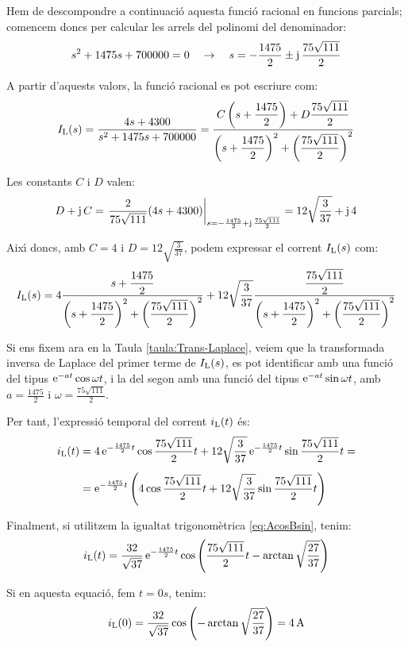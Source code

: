 \begin{exemple}
Hem de descompondre a continuaci\'{o} aquesta funci\'{o} racional en
funcions parcials; comencem doncs per calcular les arrels del
polinomi del denominador:
\[
s^2 +1475 s + 700000 = 0 \quad\rightarrow\quad s= -\frac{1475}{2}
\pm \mathrm{j}\,\frac{75\sqrt{111}}{2}
\]

A partir d'aquests valors, la  funci\'{o} racional es pot escriure com:
\[
    I_\mathrm{L}(s) =
    \frac{4 s+ 4300}{s^2 +1475 s + 700000} =
    \frac{C\left(s+\dfrac{1475}{2}\right)+D\dfrac{75\sqrt{111}}{2}}
    {\left(s+\dfrac{1475}{2}\right)^2+\left(\dfrac{75\sqrt{111}}{2}\right)^2}
\]

Les constants $C$ i $D$ valen:
\[
D + \mathrm{j}\,C = \left.\frac{2}{75\sqrt{111}}(4 s
+4300)\right|_{s=-\frac{1475}{2} + \mathrm{j}\,\frac{75\sqrt{111}}{2}}=
12\sqrt{\frac{3}{37}} +\mathrm{j}\,4
\]

Aix\'{\i} doncs, amb $C=4$ i $D=12\sqrt{\frac{3}{37}}$, podem expressar
el corrent $I_\mathrm{L}(s)$ com:
\[
    I_\mathrm{L}(s) = 4\frac{s+\dfrac{1475}{2}}
    {\left(s+\dfrac{1475}{2}\right)^2+\left(\dfrac{75\sqrt{111}}{2}\right)^2}
    + 12\sqrt{\frac{3}{37}}\frac{\dfrac{75\sqrt{111}}{2}}
    {\left(s+\dfrac{1475}{2}\right)^2+\left(\dfrac{75\sqrt{111}}{2}\right)^2}
\]

\break
 Si ens fixem ara en la Taula \vref{taula:Trans-Laplace},
veiem que la transformada inversa de Laplace del primer terme de
$I_\mathrm{L}(s)$, es pot identificar amb una funci\'{o} del tipus
$\mathrm{e}^{-at}\cos\omega t$, i la del segon amb una funci\'{o} del tipus
$\mathrm{e}^{-at}\sin\omega t$, amb $a=\frac{1475}{2}$ i
$\omega=\frac{75\sqrt{111}}{2}$.

Per tant, l'expressi\'{o} temporal del corrent $i_\mathrm{L}(t)$ \'{e}s:
\[\begin{split}
    i_\mathrm{L}(t) &= 4\, \mathrm{e}^{-\frac{1475}{2}t} \cos \frac{75\sqrt{111}}{2} t +
    12\sqrt{\frac{3}{37}}\, \mathrm{e}^{-\frac{1475}{2}t} \sin
    \frac{75\sqrt{111}}{2}t = \\[1ex] &= \mathrm{e}^{-\frac{1475}{2}t} \left( 4
    \cos \frac{75\sqrt{111}}{2} t + 12\sqrt{\frac{3}{37}}\sin
    \frac{75\sqrt{111}}{2}t\right)
\end{split}\]

Finalment, si utilitzem la igualtat trigonom\`{e}trica
\eqref{eq:AcosBsin}, tenim:
\[
i_\mathrm{L}(t) = \frac{32}{\sqrt{37}}\,\mathrm{e}^{-\frac{1475}{2}t}
\cos\left(\frac{75\sqrt{111}}{2} t - \arctan
\sqrt{\frac{27}{37}}\right)
\]

Si en aquesta equaci\'{o}, fem $t=0\unit{s}$, tenim:
\[
    i_\mathrm{L}(0) = \frac{32}{\sqrt{37}} \cos\left( - \arctan
\sqrt{\frac{27}{37}}\right) = 4 \mathrm{\,A}
\]


\end{exemple}
